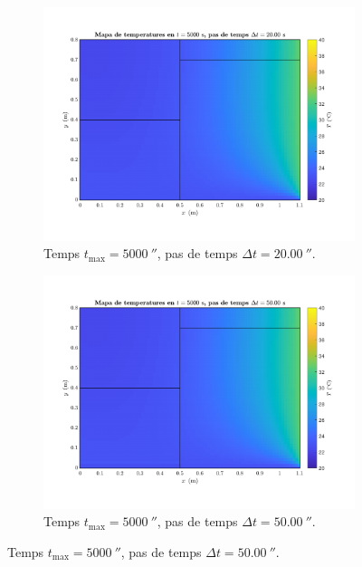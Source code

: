 \begin{figure}[ht]
	\begin{subfigure}{.5\textwidth}
		\centering
		\includegraphics[width=.95\linewidth]{imagenes/04_influencia/pas_temps/pas_temps_11.pdf}
		\vspace{-15pt}
		\caption{Temps $t_\text{max} = 5000 \ \second$, pas de temps $\Delta t = 20.00 \ \second$.}
		\label{fig:pas_temps_11}
	\end{subfigure}%
	\begin{subfigure}{.5\textwidth}
		\centering
		\includegraphics[width=.95\linewidth]{imagenes/04_influencia/pas_temps/pas_temps_12.pdf}
		\vspace{-15pt}
		\caption{Temps $t_\text{max} = 5000 \ \second$, pas de temps $\Delta t = 50.00 \ \second$.}
		\label{Temps fig:pas_temps_12}
	\end{subfigure}

\end{figure}
